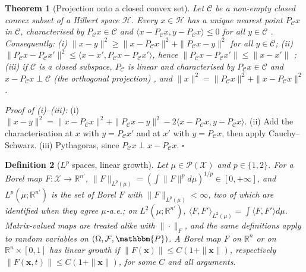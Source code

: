 \documentclass{article}
\newcommand{\RR}{\mathbb{R}}
\newcommand{\PP}{\mathbbm{P}}
\newcommand{\bx}{\mathbf{x}}
\theoremstyle{plain}
\newtheorem{theorem}{Theorem}[section]
\newtheorem{definition}[theorem]{Definition}
\theoremstyle{remark}
\begin{document}
\begin{theorem}[Projection onto a closed convex set]\label{th:projection}
Let $\mathcal C$ be a non-empty closed convex subset of a Hilbert space $\mathcal H$. Every $x\in\mathcal H$ has a unique nearest point $P_{\mathcal C}x$
in $\mathcal C$, characterised by $P_{\mathcal C}x\in\mathcal C$ and $\langle x-P_{\mathcal C}x,y-P_{\mathcal C}x\rangle\le0$ for all $y\in\mathcal C$
\citep[Thm.~5.2]{brezis2011functional}. Consequently:
(i) $\|x-y\|^2\ge\|x-P_{\mathcal C}x\|^2+\|P_{\mathcal C}x-y\|^2$ for all $y\in\mathcal C$;
(ii) $\|P_{\mathcal C}x-P_{\mathcal C}x'\|^2\le\langle x-x',P_{\mathcal C}x-P_{\mathcal C}x'\rangle$, hence $\|P_{\mathcal C}x-P_{\mathcal C}x'\|\le\|x-x'\|$
\citep[Prop.~5.3]{brezis2011functional};
(iii) if $\mathcal C$ is a closed subspace, $P_{\mathcal C}$ is linear and characterised by $P_{\mathcal C}x\in\mathcal C$ and $x-P_{\mathcal C}x\perp\mathcal C$ (the
\emph{orthogonal projection}) \citep[Cor.~5.4]{brezis2011functional}, and $\|x\|^2=\|P_{\mathcal C}x\|^2+\|x-P_{\mathcal C}x\|^2$.
\end{theorem}
\textit{Proof of (i)--(iii):}
(i) $\|x-y\|^2=\|x-P_{\mathcal C}x\|^2+\|P_{\mathcal C}x-y\|^2-2\langle x-P_{\mathcal C}x,y-P_{\mathcal C}x\rangle$. (ii) Add the characterisation at $x$ with
$y=P_{\mathcal C}x'$ and at $x'$ with $y=P_{\mathcal C}x$, then apply Cauchy--Schwarz. (iii) Pythagoras, since $P_{\mathcal C}x\perp x-P_{\mathcal C}x$.
\hfill$\square$

\begin{definition}[$L^p$ spaces, linear growth]\label{def:lp}
Let $\mu\in\mathcal P(\mathcal X)$ and $p\in\{1,2\}$. For a Borel map $F:\mathcal X\to\RR^{n'}$, $\|F\|_{L^p(\mu)}=(\int\|F\|^pd\mu)^{1/p}\in[0,+\infty]$, and
$L^p(\mu;\RR^{n'})$ is the set of Borel $F$ with $\|F\|_{L^p(\mu)}<\infty$, two of which are identified when they agree $\mu$-a.e.; on
$L^2(\mu;\RR^{n'})$, $\langle F,F'\rangle_{L^2(\mu)}=\int\langle F,F'\rangle d\mu$. Matrix-valued maps are treated alike with $\|\cdot\|_F$, and the same
definitions apply to random variables on $(\Omega,\mathcal F,\PP)$. A Borel map $F$ on $\RR^n$ or on $\RR^n\times[0,1]$ has \emph{linear growth} if
$\|F(\bx)\|\le C(1+\|\bx\|)$, respectively $\|F(\bx,t)\|\le C(1+\|\bx\|)$, for some $C$ and all arguments.
\end{definition}
\end{document}
